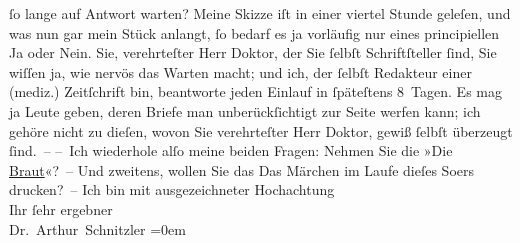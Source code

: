\begin{ledgroupsized}[t]{13cm}
                    ſo lange auf Antwort warten? Meine Skizze iſt in einer viertel Stunde geleſen, und was
                    nun gar mein Stück anlangt,
                    ſo bedarf es ja vorläufig nur eines principiellen Ja oder Nein. Sie,
                    verehrteſter Herr Doktor, {\pb}der Sie ſelbſt
                    Schriftſteller ſind, Sie wiſſen ja, wie nervös das Warten macht; und ich, der
                    ſelbſt Redakteur einer (mediz.) Zeitſchrift
                    bin, beantworte jeden Einlauf in ſpäteſtens 8 Tagen. Es mag ja Leute geben,
                    deren Briefe man unberückſichtigt zur Seite werfen kann; ich gehöre {\pb}nicht zu dieſen, wovon Sie verehrteſter Herr Doktor,
                    gewiß ſelbſt überzeugt ſind. –\pend
           \pstart
           – Ich wiederhole alſo meine beiden Fragen: Nehmen Sie die »Die \uline{Braut}«? – Und zweitens, wollen Sie das Das
                        Märchen im Laufe dieſes So{\geminationm}ers drucken? –\pend
           \pstart
           Ich bin mit ausgezeichneter Hochachtung{\\[\baselineskip]}Ihr ſehr ergebner{\\[\baselineskip]}\spacefill\mbox{Dr. Arthur Schnitzler}\pend
           \leftskip=0em{}
         
         \endnumbering{}\end{ledgroupsized}  \newcommand{\dateiname}{L00220}\newcommand{\titel}{Arthur Schnitzler an Wilhelm Bölsche, 11. 6. 1893}\newcommand{\editorInnen}{Martin Anton Müller und Gerd-Hermann Susen}
      